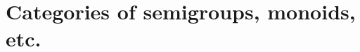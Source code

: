 
\section[Categories of structures]{Categories of semigroups, monoids, etc.}
\label{sec:cats-of-semigroups-monoids-etc}


